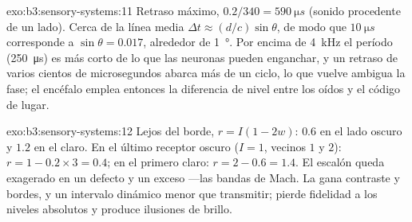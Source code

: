 \begin{solution}{exo:b3:sensory-systems:11}
Retraso máximo, $0.2/340 = \qty{590}{\micro s}$ (sonido procedente de un
lado). Cerca de la línea media $\Delta t \approx (d/c)\sin\theta$, de
modo que $\qty{10}{\micro
s}$ corresponde a $\sin\theta = 0.017$, alrededor de
\qty{1}{\degree}. Por encima de \qty{4}{kHz} el período
(\qty{250}{\micro s}) es más corto de lo que las neuronas pueden
enganchar, y un retraso de varios cientos de microsegundos abarca más
de un ciclo, lo que vuelve ambigua la fase; el encéfalo emplea entonces
la diferencia de nivel entre los oídos y el código de lugar.
\end{solution}

\begin{solution}{exo:b3:sensory-systems:12}
Lejos del borde, $r = I(1 - 2w)$: $0.6$ en el lado oscuro y $1.2$ en el
claro. En el último receptor oscuro ($I = 1$, vecinos $1$ y $2$): $r
= 1 - 0.2\times 3 = 0.4$; en el primero claro: $r = 2 - 0.6 = 1.4$. El
escalón queda exagerado en un defecto y un exceso ---las bandas de
Mach. La  gana contraste y bordes, y un intervalo dinámico menor
que transmitir; pierde fidelidad a los niveles absolutos y produce
ilusiones de brillo.
\end{solution}

